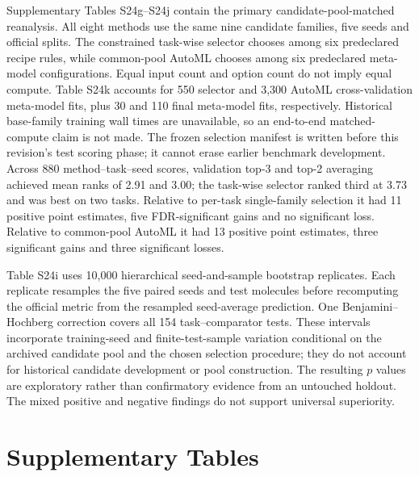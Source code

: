 \documentclass[10pt]{article}
\newcommand{\suppnote}[1]{\section*{#1}\addcontentsline{toc}{section}{#1}}
\begin{document}
Supplementary Tables S24g--S24j contain the primary candidate-pool-matched reanalysis. All eight methods use the same nine candidate families, five seeds and official splits. The constrained task-wise selector chooses among six predeclared recipe rules, while common-pool AutoML chooses among six predeclared meta-model configurations. Equal input count and option count do not imply equal compute. Table S24k accounts for 550 selector and 3,300 AutoML cross-validation meta-model fits, plus 30 and 110 final meta-model fits, respectively. Historical base-family training wall times are unavailable, so an end-to-end matched-compute claim is not made. The frozen selection manifest is written before this revision's test scoring phase; it cannot erase earlier benchmark development. Across 880 method--task--seed scores, validation top-3 and top-2 averaging achieved mean ranks of 2.91 and 3.00; the task-wise selector ranked third at 3.73 and was best on two tasks. Relative to per-task single-family selection it had 11 positive point estimates, five FDR-significant gains and no significant loss. Relative to common-pool AutoML it had 13 positive point estimates, three significant gains and three significant losses.

Table S24i uses 10,000 hierarchical seed-and-sample bootstrap replicates. Each replicate resamples the five paired seeds and test molecules before recomputing the official metric from the resampled seed-average prediction. One Benjamini--Hochberg correction covers all 154 task--comparator tests. These intervals incorporate training-seed and finite-test-sample variation conditional on the archived candidate pool and the chosen selection procedure; they do not account for historical candidate development or pool construction. The resulting $p$ values are exploratory rather than confirmatory evidence from an untouched holdout. The mixed positive and negative findings do not support universal superiority.

\suppnote{Supplementary Tables}
\end{document}
